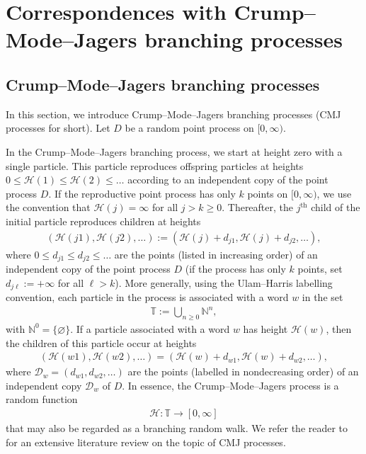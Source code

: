 \documentclass[a4,12pt]{amsart}
\numberwithin{equation}{section}
\begin{document}
    


\section{Correspondences with Crump--Mode--Jagers branching processes} \label{sec:CMJ}

\subsection{Crump--Mode--Jagers branching processes}

	In this section, we introduce Crump--Mode--Jagers branching processes 
	(CMJ processes for short). Let 
	$D$ be a random point process on $[0, \infty)$. 

 	In the Crump--Mode--Jagers 
	branching process, we start at height zero with a single particle. This particle 
	reproduces offspring particles at heights 
	$0 \leq \mathcal{H}(1) \leq \mathcal{H}(2) \leq \ldots$ according to an independent copy of the 
	point process 
	$D$. If the reproductive point process has only $k$ points on 
	$[0,\infty)$, we use the convention that $\mathcal{H}(j) = \infty$ for all $j > k\geq 0$. 
	Thereafter, the $j^{\text{th}}$ child of the initial particle reproduces 
	children at heights
	\begin{align*}
		(\mathcal{H}(j1),\mathcal{H}(j2),\ldots ) := 
		(\mathcal{H}(j)+ d_{j1},\mathcal{H}(j) + d_{j2},\ldots),
	\end{align*}
	where $0 \leq d_{j1} \leq d_{j2} \leq \ldots$ are the points (listed in increasing order) 
	of an independent copy of the point process $D$ (if the process has only $k$ points, 
	set $d_{j\ell } :=+ \infty$ for all $\ell > k$). More generally, using the Ulam--Harris 
	labelling convention, each particle in the process is associated with a word $w$ in the set
	\begin{align*}
		\mathbb{T} := \bigcup_{n \geq 0} \mathbb{N}^n,
	\end{align*}
	with $\mathbb{N}^0=\{\varnothing\}$.
	If a particle associated with a word $w$ has height $\mathcal{H}(w)$, then the children 
	of this particle occur at heights
	\begin{align*}
		\left( \mathcal{H}(w1),\mathcal{H}(w2),\ldots \right) 
		= \left( \mathcal{H}(w) + d_{w1} , \mathcal{H}(w) + d_{w2},\ldots \right),
	\end{align*}
	where $\mathcal{D}_w = (d_{w1},d_{w2},\ldots )$ are the points (labelled in nondecreasing order) 
	of an independent copy $\mathcal{D}_w$ of $D$. In essence, the Crump--Mode--Jagers process is a random function
	\begin{align*}
		\mathcal{H}: \mathbb{T} \to [0,\infty]
	\end{align*}
	that may also be regarded as a branching random walk.
	We refer the reader to~\cite{Iksanov:2024:asymptotic} for an extensive literature review on the topic of CMJ processes.
\end{document}
